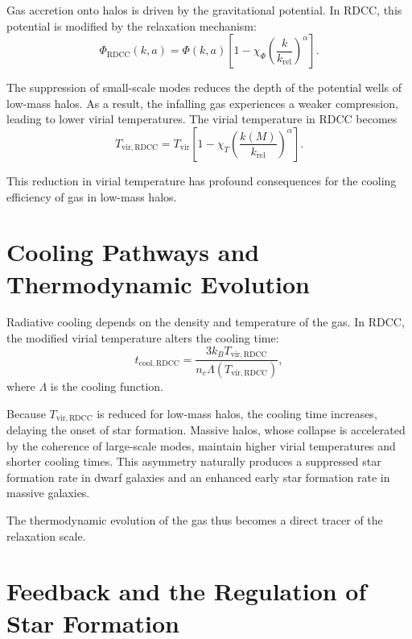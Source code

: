 \documentclass[11pt,a4paper]{article}
\begin{document}
Gas accretion onto halos is driven by the gravitational potential. In RDCC, this 
potential is modified by the relaxation mechanism:
\begin{equation}
    \Phi_{\mathrm{RDCC}}(k,a)
    = \Phi(k,a)
      \left[1 - \chi_{\Phi}
      \left(\frac{k}{k_{\mathrm{rel}}}\right)^{\alpha}\right].
\end{equation}

The suppression of small-scale modes reduces the depth of the potential wells of 
low-mass halos. As a result, the infalling gas experiences a weaker compression, 
leading to lower virial temperatures. The virial temperature in RDCC becomes
\begin{equation}
    T_{\mathrm{vir,RDCC}}
    = T_{\mathrm{vir}}
      \left[1 - \chi_{T}
      \left(\frac{k(M)}{k_{\mathrm{rel}}}\right)^{\alpha}\right].
\end{equation}

This reduction in virial temperature has profound consequences for the cooling 
efficiency of gas in low-mass halos.
\section{Cooling Pathways and Thermodynamic Evolution}

Radiative cooling depends on the density and temperature of the gas. In RDCC, the 
modified virial temperature alters the cooling time:
\begin{equation}
    t_{\mathrm{cool,RDCC}}
    = \frac{3 k_{B} T_{\mathrm{vir,RDCC}}}{n_{e} \Lambda(T_{\mathrm{vir,RDCC}})},
\end{equation}
where $\Lambda$ is the cooling function.

Because $T_{\mathrm{vir,RDCC}}$ is reduced for low-mass halos, the cooling time 
increases, delaying the onset of star formation. Massive halos, whose collapse is 
accelerated by the coherence of large-scale modes, maintain higher virial 
temperatures and shorter cooling times. This asymmetry naturally produces a 
suppressed star formation rate in dwarf galaxies and an enhanced early star 
formation rate in massive galaxies.

The thermodynamic evolution of the gas thus becomes a direct tracer of the 
relaxation scale.
\section{Feedback and the Regulation of Star Formation}
\end{document}
